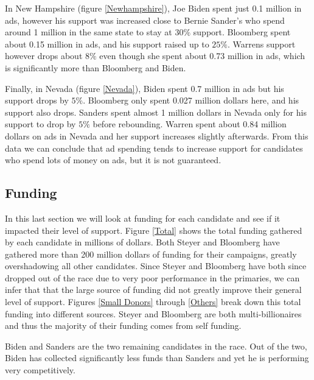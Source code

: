 In New Hampshire (figure \ref{Newhampshire}), Joe Biden spent just 0.1 million in ads, however his support was increased close to Bernie Sander's who spend around 1 million in the same state to stay at $30\%$ support. Bloomberg spent about 0.15 million in ads, and his support raised up to $25\%$. Warrens support however drops about $8\%$ even though she spent about 0.73 million in ads, which is significantly more than Bloomberg and Biden. 

Finally, in Nevada (figure \ref{Nevada}), Biden spent 0.7 million in ads but his support drops by $5\%$. Bloomberg only spent 0.027 million dollars here, and his support also drops. Sanders spent almost 1 million dollars in Nevada only for his support to drop by $5\%$ before rebounding. Warren spent about 0.84 million dollars on ads in Nevada and her support increases slightly afterwards. From this data we can conclude that ad spending tends to increase support for candidates who spend lots of money on ads, but it is not guaranteed.

\subsection{Funding}

In this last section we will look at funding for each candidate and see if it impacted their level of support. Figure \ref{Total} shows the total funding gathered by each candidate in millions of dollars. Both Steyer and Bloomberg have gathered more than 200 million dollars of funding for their campaigns, greatly overshadowing all other candidates. Since Steyer and Bloomberg have both since dropped out of the race due to very poor performance in the primaries, we can infer that that the large source of funding did not greatly improve their general level of support. Figures \ref{Small Donors} through \ref{Others} break down this total funding into different sources. Steyer and Bloomberg are both multi-billionaires and thus the majority of their funding comes from self funding.

Biden and Sanders are the two remaining candidates in the race. Out of the two, Biden has collected significantly less funds than Sanders and yet he is performing very competitively.
